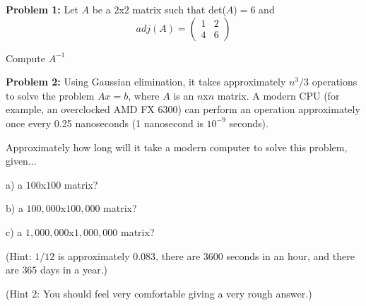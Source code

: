 \documentclass[a4paper,12pt]{article}
\begin{document}
{\Large{\bf Problem 1:}} Let $A$ be a $2$x$2$ matrix such that det($A$)$= 6$ and \[ adj(A)= \left( \begin{array}{ccc}1 & 2  \\
4 & 6  \end{array} \right)\]

Compute $A^{-1}$

\shunt

{\Large{\bf Problem 2:}} Using Gaussian elimination, it takes approximately $n^3/3$ operations to solve the problem $Ax=b$, where $A$ is an $n$x$n$ matrix. A modern CPU (for example, an overclocked AMD FX 6300) can perform an operation approximately once every 0.25 nanoseconds (1 nanosecond is $10^{-9}$ seconds).

Approximately how long will it take a modern computer to solve this problem, given...

a) a $100$x$100$ matrix?

b) a $100,000$x$100,000$ matrix?

c) a $1,000,000$x$1,000,000$ matrix?

(Hint: $1/12$ is approximately $0.083$, there are $3600$ seconds in an hour, and there are $365$ days in a year.)

(Hint 2: You should feel very comfortable giving a very rough answer.)
\end{document}
